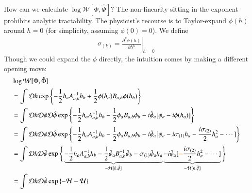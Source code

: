 \documentclass[../main.tex]{subfiles}
\begin{document}
How can we calculate $\log \mathcal W[\Phi, \hat \Phi]$? The non-linearity sitting in the exponent prohibits analytic tractability. The physicist's recourse is to Taylor-expand $\phi(h)$ around $h=0$ (for simplicity, assuming $\phi(0)=0$). We define
\begin{align*}
  \sigma_{(k)} = \left. \frac{\partial^k \phi(h)}{\partial h^k} \right|_{h=0}
\end{align*}
Though we could expand the $\phi$ directly, the intuition comes by making a different opening move:
\begin{align*}
  &
  \log \mathcal W[\Phi, \hat \Phi] \\
  &=
    \int \mathcal D h \exp \left \{
      -\frac12 h_a A^{-1}_{a,b} h_b + \frac12 \phi(h_a) B_{a,b} \phi(h_b)
    \right \} \\
  &=
    \int \mathcal D h \mathcal D \phi \mathcal D \hat \phi \exp \left \{
      -\frac12 h_a A^{-1}_{a,b} h_b 
      -\frac12 \phi_a B_{a,b} \phi_b 
      -i \hat \phi_a[\phi_a - i \phi(h_a)]
    \right \} \\
  &=
    \int \mathcal D h \mathcal D \phi \mathcal D \hat \phi \exp \left \{
      -\frac12 h_a A^{-1}_{a,b} h_b 
      -\frac12 \phi_a B_{a,b} \phi_b 
      -i \hat \phi_a[\phi_a - i\sigma_{(1)} h_a - \frac{i\sigma_{(2)}}{2} h_a^2 - \cdots]
    \right \} \\
  &=
    \int \mathcal D h \mathcal D \hat \phi \exp \Bigg \{
      \underbrace{
        -\frac12 h_a A^{-1}_{a,b} h_b 
        -\frac12 \hat \phi_a B_{a,b}^{-1} \hat \phi_b 
        - \sigma_{(1)} \hat \phi_a h_a 
      }_{
        -\mathcal H[h, \hat \phi]
      }
      \underbrace{
        -i \hat \phi_a [\fix{-}\frac{i\sigma_{(2)}}{2} h_a^2 - \cdots]
      }_{
        -\mathcal U[h, \hat \phi]
      }
    \Bigg \} \\
    &= 
      \int \mathcal D h \mathcal D \hat \phi
        \exp \left \{ - \mathcal H - \mathcal U \right \}
\end{align*}
\end{document}
